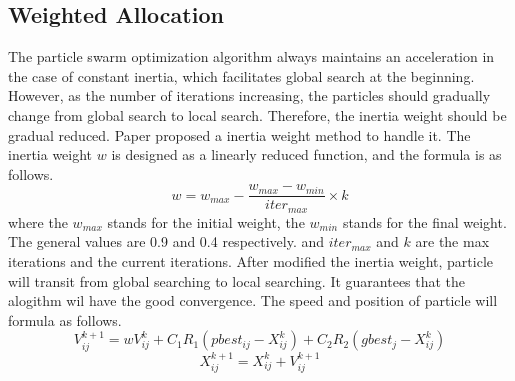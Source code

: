 \subsection{Weighted Allocation}\label{subsec:weight}
\par The particle swarm optimization algorithm always maintains an acceleration in the case of constant inertia, which facilitates global search at the beginning. However, as the number of iterations increasing, the particles should gradually change from global search to local search. Therefore, the inertia weight should be gradual reduced. Paper \cite{shi1999towards} proposed a inertia weight method to handle it. The inertia weight $w$ is designed as a linearly reduced function, and the formula is as follows.
\begin{equation}
w=w_{max}-\frac{w_{max}-w_{min}}{iter_{max}} \times k
\end{equation}
where the $ w_{max} $ stands for the initial weight, the $ w_{min} $ stands for the final weight. The general values are 0.9 and 0.4 respectively. and $ iter_{max} $ and $ k $ are the max iterations and the current iterations. After modified the inertia weight, particle will transit from global searching to local searching. It guarantees that the alogithm wil have the good convergence. The speed and position of particle will formula as follows.
\begin{equation}
V^{k+1}_{ij} = wV^{k}_{ij} + C_1 R_1(pbest_{ij}-X^k_{ij}) + C_2 R_2 (gbest_j-X^k_{ij})
\end{equation}
\begin{equation}
X^{k+1}_{ij} = X^{k}_{ij} + V^{k+1}_{ij}
\end{equation}
